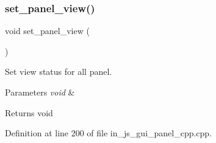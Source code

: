 \subsubsection{set\_panel\_view()}
{\footnotesize\ttfamily void set\+\_\+panel\+\_\+view (\begin{DoxyParamCaption}\item[{void}]{ }\end{DoxyParamCaption})}



Set view status for all panel. 


\begin{DoxyParams}{Parameters}
{\em void} & \\
\hline
\end{DoxyParams}
\begin{DoxyReturn}{Returns}
void 
\end{DoxyReturn}


Definition at line 200 of file in\+\_\+js\+\_\+gui\+\_\+panel\+\_\+cpp.\+cpp.

